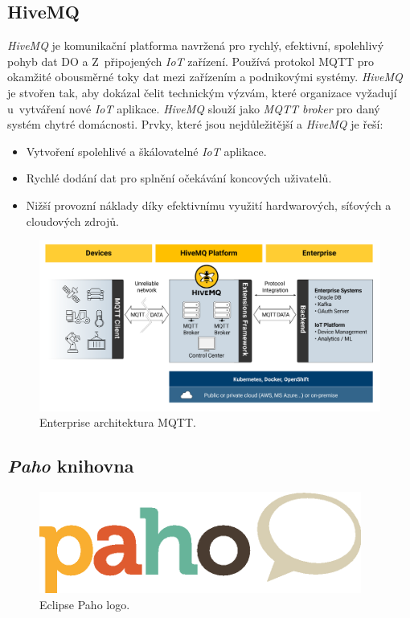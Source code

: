\newpage
\subsection*{HiveMQ}
\label{pouzite:hivemq}

\emph{HiveMQ} je komunikační platforma navržená pro rychlý, efektivní, spolehlivý pohyb dat DO a Z~připojených \emph{IoT} zařízení.
Používá protokol MQTT pro okamžité obousměrné toky dat mezi zařízením a podnikovými systémy.
\emph{HiveMQ} je stvořen tak, aby dokázal čelit technickým výzvám, které organizace vyžadují u~vytváření nové \emph{IoT} aplikace.
\emph{HiveMQ} slouží jako \emph{MQTT broker} pro daný systém chytré domácnosti.
\newline
Prvky, které jsou nejdůležitější a \emph{HiveMQ} je řeší:
\begin{itemize}
  \item Vytvoření spolehlivé a škálovatelné \emph{IoT} aplikace.
  \item Rychlé dodání dat pro splnění očekávání koncových uživatelů.
  \item Nižší provozní náklady díky efektivnímu využití hardwarových, síťových a cloudových zdrojů.~\cite{hivemq:info}
\end{itemize}

\begin{figure}[hbt]
  \centering
  \includegraphics[width=1 \linewidth]{obrazky-figures/hivemq_arch.png}
  \caption{Enterprise architektura MQTT.~\cite{hivemq:info}}
  \label{figure:hivemq_flow}
\end{figure}

\subsection*{\emph{Paho} knihovna}
\label{pouzite:paho}
\begin{figure}[hbt]
  \centering
  \includegraphics[width=.2 \linewidth]{obrazky-figures/paho.png}
  \caption{Eclipse Paho logo.~\cite{paho:info}}
  \label{figure:paho}
\end{figure}

